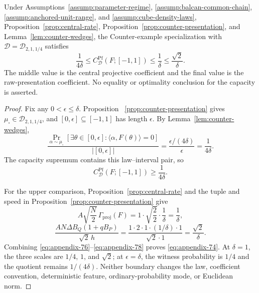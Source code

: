 \begin{proposition}
\label{prop:counter-scale}
Under Assumptions~\ref{assump:parameter-regime},
\ref{assump:balcan-common-chain},
\ref{assump:anchored-unit-range}, and
\ref{assump:cube-density-laws}, Proposition~\ref{prop:central-rate},
Proposition~\ref{prop:counter-presentation}, and
Lemma~\ref{lem:counter-wedges}, the Counter-example specialization with
$\mathcal D=\mathcal D_{2,1,1/4}$ satisfies
\begin{equation}
\frac1{4\delta}
\leq C^{\mathrm{Pf}}_{\mathcal D}(F;[-1,1])
\leq\frac1\delta
\leq\frac{\sqrt2}{\delta}.
\label{eq:appendix-74}
\end{equation}
The middle value is the central projective coefficient and the final value is
the raw-presentation coefficient.  No equality or optimality conclusion for
the capacity is asserted.
\end{proposition}

\begin{proof}
Fix any $0<\epsilon\leq\delta$.  Proposition
~\ref{prop:counter-presentation} gives
$\mu_\square\in\mathcal D_{2,1,1/4}$, and
$[0,\epsilon]\subseteq[-1,1]$ has length $\epsilon$.  By
Lemma~\ref{lem:counter-wedges},
\begin{equation}
\frac{
\Pr_{\alpha\sim\mu_\square}
[\exists\theta\in[0,\epsilon]:
 \langle\alpha,F(\theta)\rangle=0]}
{|[0,\epsilon]|}
=\frac{\epsilon/(4\delta)}\epsilon
=\frac1{4\delta}.
\label{eq:appendix-75}
\end{equation}
The capacity supremum contains this law--interval pair, so
\begin{equation}
C^{\mathrm{Pf}}_{\mathcal D}(F;[-1,1])
\geq\frac1{4\delta}.
\label{eq:appendix-76}
\end{equation}

For the upper comparison, Proposition~\ref{prop:central-rate} and the tuple
and speed in Proposition~\ref{prop:counter-presentation} give
\begin{equation}
A\sqrt{\frac N2}\,\Gamma_{\mathrm{proj}}(F)
=1\cdot\sqrt{\frac22}\cdot\frac1\delta
=\frac1\delta,
\label{eq:appendix-77}
\end{equation}
\begin{equation}
\frac{AN\Delta B_Q(1+qB_P)}{\sqrt2\,h}
=\frac{1\cdot2\cdot1\cdot(1/\delta)\cdot1}
       {\sqrt2\cdot1}
=\frac{\sqrt2}{\delta}.
\label{eq:appendix-78}
\end{equation}
Combining \eqref{eq:appendix-76}--\eqref{eq:appendix-78} proves \eqref{eq:appendix-74}.  At $\delta=1$, the three scales
are $1/4$, $1$, and $\sqrt2$; at $\epsilon=\delta$, the witness probability
is $1/4$ and the quotient remains $1/(4\delta)$.  Neither boundary changes
the law, coefficient convention, deterministic feature, ordinary-probability
mode, or Euclidean norm.
\end{proof}

